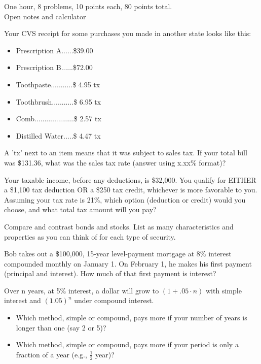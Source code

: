 \documentclass[12pt]{exam}
\begin{document}
\begin{flushleft}
    One hour, 8 problems, 10 points each, 80 points total. \\
    Open notes and calculator
\end{flushleft}

\begin{questions}
    \question Your CVS receipt for some purchases you made in another state looks like this:
    \begin{itemize}
        \item Prescription A......\$39.00
        \item Prescription B......\$72.00
        \item Toothpaste...........\$ 4.95    tx
        \item Toothbrush...........\$ 6.95    tx
        \item Comb....................\$ 2.57    tx
        \item Distilled Water.....\$ 4.47    tx
    \end{itemize}

    A 'tx' next to an item means that it was subject to sales tax.
    If your total bill was \$131.36, what was the sales tax rate (answer using x.xx\% format)?
    \vspace{1in}

    \question Your taxable income, before any deductions, is \$32,000.  You qualify for EITHER a
    \$1,100 tax deduction OR a \$250 tax credit, whichever is more favorable to you.  Assuming your
    tax rate is 21\%, which option (deduction or credit) would  you choose, and what total tax
    amount will you pay?
    \vspace{1in}

    \question Compare and contrast bonds and stocks.  List as many characteristics and properties
    as you can think of for each type of security.
    \vspace{1in}

    \question Bob takes out a \$100,000, 15-year level-payment mortgage at 8\% interest compounded monthly on January 1.
    On February 1, he makes his first payment (principal and interest).  How much of that first payment
    is interest?
    \vspace{1in}

    \question Over n years, at 5\% interest, a dollar will grow to $ (1+.05 \cdot n) $ with simple interest
    and $ (1.05)^n $ under compound interest.
    \begin{itemize}
        \item Which method, simple or compound, pays more if your number of
            years is longer than one (say 2 or 5)?
        \item Which method, simple or compound, pays more if your period is only
            a fraction of a year (e.g., $ \frac{1}{2} $ year)?
    \end{itemize}
    \vspace{1.5in}


\end{questions}
\end{document}
